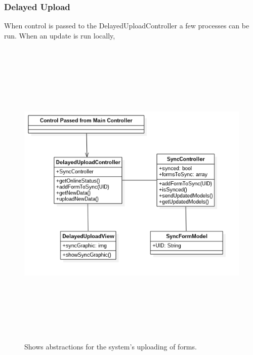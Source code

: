 \documentclass[twoside,letterpaper]{article}
\begin{document}
\subsubsection{Delayed Upload}

When control is passed to the DelayedUploadController a few processes can be run. When an update is run locally,

\begin{figure}[H]
\centering
\includegraphics[width=6in,height=6in]{Delayed_Upload_UML.png}
\caption{Shows abstractions for the system's uploading of forms.}
\end{figure}
\end{document}

